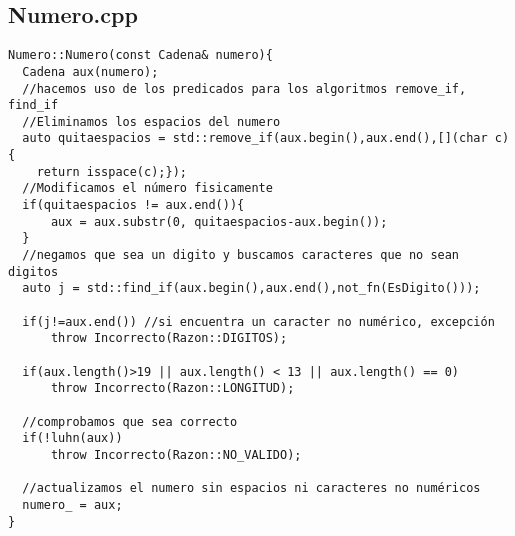 \subsection{Numero.cpp}
\begin{verbatim}
Numero::Numero(const Cadena& numero){
  Cadena aux(numero);
  //hacemos uso de los predicados para los algoritmos remove_if, find_if
  //Eliminamos los espacios del numero
  auto quitaespacios = std::remove_if(aux.begin(),aux.end(),[](char c){
    return isspace(c);});
  //Modificamos el número fisicamente
  if(quitaespacios != aux.end()){
      aux = aux.substr(0, quitaespacios-aux.begin());
  }
  //negamos que sea un digito y buscamos caracteres que no sean digitos
  auto j = std::find_if(aux.begin(),aux.end(),not_fn(EsDigito()));

  if(j!=aux.end()) //si encuentra un caracter no numérico, excepción
      throw Incorrecto(Razon::DIGITOS); 

  if(aux.length()>19 || aux.length() < 13 || aux.length() == 0)
      throw Incorrecto(Razon::LONGITUD);

  //comprobamos que sea correcto
  if(!luhn(aux))
      throw Incorrecto(Razon::NO_VALIDO);

  //actualizamos el numero sin espacios ni caracteres no numéricos
  numero_ = aux;
}
\end{verbatim}
